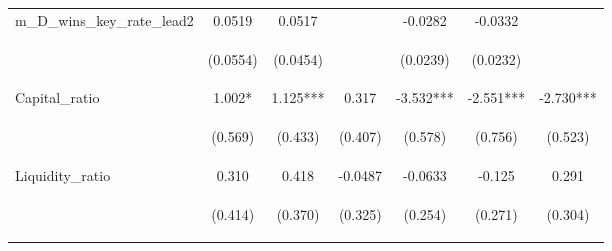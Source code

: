 \documentclass[]{article}
\begin{document}
\begin{center}
\begin{tabular}{lcccccc}
m\_D\_wins\_key\_rate\_lead2 & 0.0519 & 0.0517 &  & -0.0282 & -0.0332 &  \\
\vspace{4pt} & \begin{footnotesize}(0.0554)\end{footnotesize} & \begin{footnotesize}(0.0454)\end{footnotesize} & \begin{footnotesize}\end{footnotesize} & \begin{footnotesize}(0.0239)\end{footnotesize} & \begin{footnotesize}(0.0232)\end{footnotesize} & \begin{footnotesize}\end{footnotesize} \\
Capital\_ratio & 1.002* & 1.125*** & 0.317 & -3.532*** & -2.551*** & -2.730*** \\
\vspace{4pt} & \begin{footnotesize}(0.569)\end{footnotesize} & \begin{footnotesize}(0.433)\end{footnotesize} & \begin{footnotesize}(0.407)\end{footnotesize} & \begin{footnotesize}(0.578)\end{footnotesize} & \begin{footnotesize}(0.756)\end{footnotesize} & \begin{footnotesize}(0.523)\end{footnotesize} \\
Liquidity\_ratio & 0.310 & 0.418 & -0.0487 & -0.0633 & -0.125 & 0.291 \\
\vspace{4pt} & \begin{footnotesize}(0.414)\end{footnotesize} & \begin{footnotesize}(0.370)\end{footnotesize} & \begin{footnotesize}(0.325)\end{footnotesize} & \begin{footnotesize}(0.254)\end{footnotesize} & \begin{footnotesize}(0.271)\end{footnotesize} & \begin{footnotesize}(0.304)\end{footnotesize} \\

\end{tabular}
\end{center}
\end{document}
